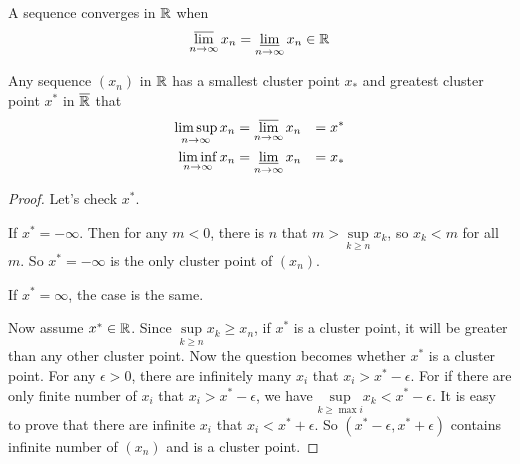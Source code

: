 \begin{theorem}
    A sequence converges in $\mathbb{R}$ when 
    \begin{equation}
        \varlimsup_{n\rightarrow \infty} x_n = \varliminf_{n\rightarrow \infty} x_n \in \mathbb{R}
    \end{equation}
\end{theorem}

\begin{theorem}
    Any sequence $(x_n)$ in $\mathbb{R}$ has a smallest cluster point $x_*$ and greatest cluster point $x^*$ in $\overline{\mathbb{R}}$ that
    \begin{equation}
        \begin{aligned}
            \limsup_{n \rightarrow \infty} x_n &= \varlimsup_{n\rightarrow \infty} x_n &= x^* \\
            \liminf_{n \rightarrow \infty} x_n &= \varliminf_{n\rightarrow \infty} x_n &= x_*
        \end{aligned}
    \end{equation}
\end{theorem}
\begin{proof}
    Let's check $x^*$. 
    
    If $x^* = - \infty$. Then for any $m < 0$, there is $n$ that $m > \underset{k \geq n}{\text{ sup }} x_k$, so $x_k < m$ for all $m$. So $x^* = -\infty$ is the only cluster point of $(x_n)$.
    
    If $x^* = \infty$, the case is the same.
        
    Now assume $x^* \in \mathbb{R}$. Since $\underset{k \geq n}{\text{ sup }} x_k \geq x_n$, if $x^*$ is a cluster point, it will be greater than any other cluster point. Now the question becomes whether $x^*$ is a cluster point. For any $\epsilon>0$, there are infinitely many $x_i$ that $x_i > x^* - \epsilon$. For if there are only finite number of $x_i$ that $x_i > x^* - \epsilon$, we have $\underset{k \geq \max i }{\text{ sup }} x_k < x^* - \epsilon$. It is easy to prove that there are infinite $x_i$ that $x_i < x^* + \epsilon$. So $(x^* - \epsilon, x^* + \epsilon)$ contains infinite number of $(x_n)$ and is a cluster point.
\end{proof}


